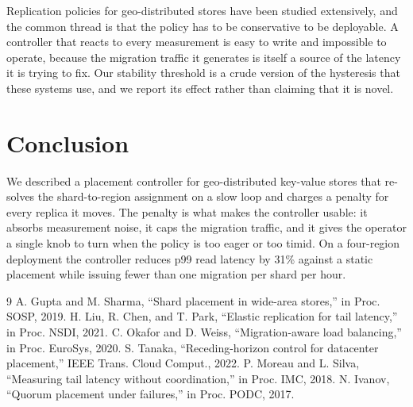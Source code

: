 ﻿\documentclass[10pt,twocolumn,letterpaper]{article}
\begin{document}
Replication policies for geo-distributed stores have been studied extensively, and the
common thread is that the policy has to be conservative to be deployable. A controller
that reacts to every measurement is easy to write and impossible to operate, because the
migration traffic it generates is itself a source of the latency it is trying to fix. Our
stability threshold is a crude version of the hysteresis that these systems use, and we
report its effect rather than claiming that it is novel.

\section{Conclusion}
We described a placement controller for geo-distributed key-value stores that re-solves
the shard-to-region assignment on a slow loop and charges a penalty for every replica it
moves. The penalty is what makes the controller usable: it absorbs measurement noise, it
caps the migration traffic, and it gives the operator a single knob to turn when the
policy is too eager or too timid. On a four-region deployment the controller reduces p99
read latency by 31\% against a static placement while issuing fewer than one migration
per shard per hour.

\begin{thebibliography}{9}
 A. Gupta and M. Sharma, ``Shard placement in wide-area stores,'' in Proc. SOSP, 2019.
 H. Liu, R. Chen, and T. Park, ``Elastic replication for tail latency,'' in Proc. NSDI, 2021.
 C. Okafor and D. Weiss, ``Migration-aware load balancing,'' in Proc. EuroSys, 2020.
 S. Tanaka, ``Receding-horizon control for datacenter placement,'' IEEE Trans. Cloud Comput., 2022.
 P. Moreau and L. Silva, ``Measuring tail latency without coordination,'' in Proc. IMC, 2018.
 N. Ivanov, ``Quorum placement under failures,'' in Proc. PODC, 2017.
\end{thebibliography}
\end{document}
